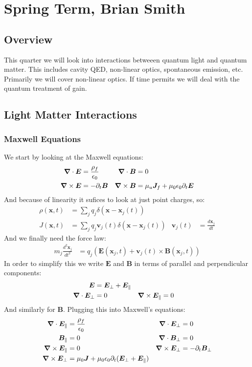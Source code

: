 \chapter{Spring Term, Brian Smith}
\section*{Overview}
This quarter we will look into interactions betweeen quantum light and quantum matter. This includes cavity QED, non-linear optics, spontaneous emission, etc. Primarily we will cover non-linear optics.
If time permits we will deal with the quantum treatment of gain.
\section{Light Matter Interactions}
\subsection{Maxwell Equations}
We start by looking at the Maxwell equations:
\begin{align*}
	\bm{\nabla}\cdot\bm{E} &= \frac{\rho_f}{\epsilon_0} & \bm{\nabla}\cdot\bm{B} &= 0 \\
	\bm{\nabla}\times\bm{E} &= -\partial_t \bm{B} & \bm{\nabla}\times\bm{B} &= \mu_u\bm{J}_f + \mu_0\epsilon_0 \partial_t \bm{E}
\end{align*}
And because of linearity it sufices to look at just point charges, so:
\begin{align*}
	\rho(\bm{x},t) &= \sum_j q_j \delta(\bm{x}-\bm{x}_j(t)) \\
	J(\bm{x},t) &= \sum_j q_j \bm{v}_j(t) \delta(\bm{x}-\bm{x}_j(t)) & \bm{v}_j(t) &= \frac{d\bm{x}_j}{dt}
\end{align*}
And we finally need the force law:
\begin{align*}
	m_j\frac{d^2\bm{x}_j}{dt^2} &= q_j(\bm{E}(\bm{x}_j,t) + \bm{v}_j(t)\times\bm{B}(\bm{x}_j,t))
\end{align*}
In order to simplify this we write $\bm{E}$ and $\bm{B}$ in terms of parallel and perpendicular components:
\begin{align*}
	\bm{E} &= \bm{E}_\perp + \bm{E}_\parallel \\
	\bm{\nabla}\cdot\bm{E}_\perp &= 0 & \bm{\nabla}\times\bm{E}_\parallel &= 0
\end{align*}
And similarly for $\bm{B}$. Plugging this into Maxwell's equations:
\begin{align*}
	\bm{\nabla}\cdot\bm{E}_\parallel &= \frac{\rho_f}{\epsilon_0} & \bm{\nabla}\cdot\bm{E}_\perp &= 0 \\
	\bm{B}_\parallel &= 0 & \bm{\nabla}\cdot\bm{B}_\perp &= 0\\
	\bm{\nabla}\times\bm{E}_\parallel &= 0 & \bm{\nabla}\times\bm{E}_\perp &= -\partial_t\bm{B}_\perp \\
	\bm{\nabla}\times\bm{E}_\perp &= \mu_0 \bm{J} + \mu_0\epsilon_0\partial_t(\bm{E}_\perp + \bm{E}_\parallel)
\end{align*}
